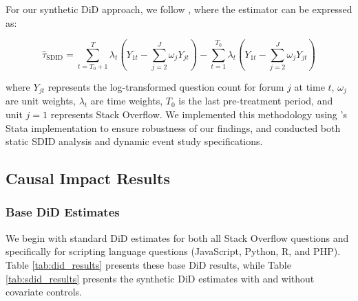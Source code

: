 For our synthetic DiD approach, we follow \textcite{arkhangelsky_synthetic_2021}, where the estimator can be expressed as:

\begin{equation}\label{eq:synthdid}
\hat{\tau}_{\text{SDID}} = \sum_{t=T_0+1}^T \lambda_t \left( Y_{1t} - \sum_{j=2}^J \omega_j Y_{jt} \right) - \sum_{t=1}^{T_0} \lambda_t \left( Y_{1t} - \sum_{j=2}^J \omega_j Y_{jt} \right)
\end{equation}

where $Y_{jt}$ represents the log-transformed question count for forum $j$ at time $t$, $\omega_j$ are unit weights, $\lambda_t$ are time weights, $T_0$ is the last pre-treatment period, and unit $j=1$ represents Stack Overflow. We implemented this methodology using \textcite{clarke_synthetic_2023, ciccia_short_2024}'s Stata implementation to ensure robustness of our findings, and conducted both static SDID analysis and dynamic event study specifications.


\subsection{Causal Impact Results}


\subsubsection{Base DiD Estimates}
We begin with standard DiD estimates for both all Stack Overflow questions and specifically for scripting language questions (JavaScript, Python, R, and PHP). Table \ref{tab:did_results} presents these base DiD results, while Table \ref{tab:sdid_results} presents the synthetic DiD estimates with and without covariate controls.

